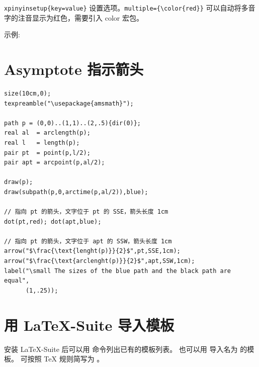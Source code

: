 \documentclass[a4paper,11pt]{article}
\begin{document}
\verb+xpinyinsetup{key=value}+ 设置选项。\verb+multiple={\color{red}}+
可以自动将多音字的注音显示为红色，需要引入 color 宏包。

\vspace{3mm}
示例: {\LARGE{}}


\section{Asymptote 指示箭头}
\begin{Verbatim}
size(10cm,0);
texpreamble("\usepackage{amsmath}");

path p = (0,0)..(1,1)..(2,.5){dir(0)};
real al  = arclength(p);
real l   = length(p);
pair pt  = point(p,l/2);
pair apt = arcpoint(p,al/2);

draw(p);
draw(subpath(p,0,arctime(p,al/2)),blue);

// 指向 pt 的箭头，文字位于 pt 的 SSE，箭头长度 1cm
dot(pt,red); dot(apt,blue); 

// 指向 pt 的箭头，文字位于 apt 的 SSW，箭头长度 1cm
arrow("$\frac{\text{lenght(p)}}{2}$",pt,SSE,1cm);
arrow("$\frac{\text{arclenght(p)}}{2}$",apt,SSW,1cm);
label("\small The sizes of the blue path and the black path are equal",
      (1,.25));
\end{Verbatim}

\section{用 \LaTeX -Suite 导入模板}
安装 LaTeX{}-Suite 后可以用  命令列出已有的模板列表。%
也可以用 \mbox{} 导入名为  的模板。
 可按照 \TeX{} 规则简写为  。
\end{document}
